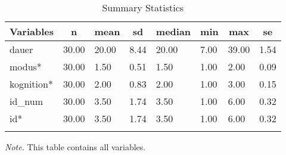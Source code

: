 \documentclass[
  doc,floatsintext]{apa6}
\begin{document}
\begin{table}[tbp]
\begin{center}
\begin{threeparttable}
\end{threeparttable}
\end{center}

\end{table}

\begin{table}[tbp]

\begin{center}
\begin{threeparttable}

\caption{\label{tab:tabsumstat}Summary Statistics}

\begin{tabular}{llllllll}
\toprule
Variables & \multicolumn{1}{c}{n} & \multicolumn{1}{c}{mean} & \multicolumn{1}{c}{sd} & \multicolumn{1}{c}{median} & \multicolumn{1}{c}{min} & \multicolumn{1}{c}{max} & \multicolumn{1}{c}{se}\\
\midrule
dauer & 30.00 & 20.00 & 8.44 & 20.00 & 7.00 & 39.00 & 1.54\\
modus* & 30.00 & 1.50 & 0.51 & 1.50 & 1.00 & 2.00 & 0.09\\
kognition* & 30.00 & 2.00 & 0.83 & 2.00 & 1.00 & 3.00 & 0.15\\
id\_num & 30.00 & 3.50 & 1.74 & 3.50 & 1.00 & 6.00 & 0.32\\
id* & 30.00 & 3.50 & 1.74 & 3.50 & 1.00 & 6.00 & 0.32\\
\bottomrule
\addlinespace
\end{tabular}

\begin{tablenotes}[para]
\normalsize{\textit{Note.} This table contains all variables.}
\end{tablenotes}

\end{threeparttable}
\end{center}

\end{table}
\end{document}
